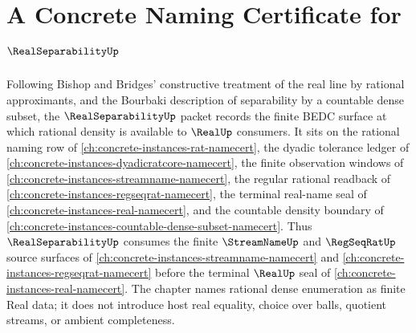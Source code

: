 \chapter{A Concrete Naming Certificate for $\RealSeparabilityUp$}
\label{ch:concrete-instances-real-separability-namecert}

Following Bishop and Bridges' constructive treatment of the real line by rational approximants, and the Bourbaki description of separability by a countable dense subset, the $\RealSeparabilityUp$ packet records the finite BEDC surface at which rational density is available to $\RealUp$ consumers. It sits on the rational naming row of \autoref{ch:concrete-instances-rat-namecert}, the dyadic tolerance ledger of \autoref{ch:concrete-instances-dyadicratcore-namecert}, the finite observation windows of \autoref{ch:concrete-instances-streamname-namecert}, the regular rational readback of \autoref{ch:concrete-instances-regseqrat-namecert}, the terminal real-name seal of \autoref{ch:concrete-instances-real-namecert}, and the countable density boundary of \autoref{ch:concrete-instances-countable-dense-subset-namecert}. Thus $\RealSeparabilityUp$ consumes the finite $\StreamNameUp$ and $\RegSeqRatUp$ source surfaces of \autoref{ch:concrete-instances-streamname-namecert} and \autoref{ch:concrete-instances-regseqrat-namecert} before the terminal $\RealUp$ seal of \autoref{ch:concrete-instances-real-namecert}. The chapter names rational dense enumeration as finite Real data; it does not introduce host real equality, choice over balls, quotient streams, or ambient completeness.

